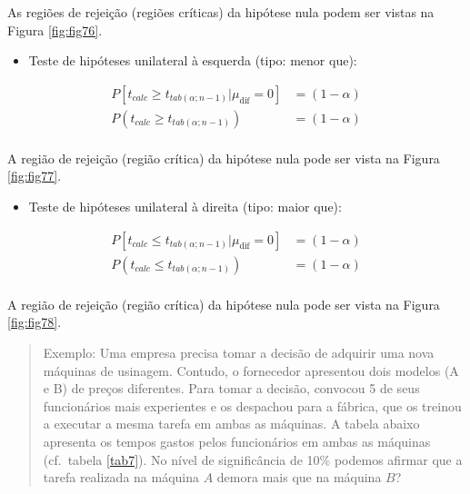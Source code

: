 \documentclass[
]{book}
\providecommand{\tightlist}{%
  \setlength{\itemsep}{0pt}\setlength{\parskip}{0pt}}
\begin{document}
\hfill\break

As regiões de rejeição (regiões críticas) da hipótese nula podem ser vistas na Figura \ref{fig:fig76}.

\hfill\break

\begin{itemize}
\tightlist
\item
  Teste de hipóteses unilateral à esquerda (tipo: menor que):
\end{itemize}

\hfill\break

\begin{align*}
P[t_{calc} \ge {t}_{tab\left(\alpha ; n-1\right)} |\mu_{\text{dif}}=0] &  =(1-\alpha)\\
P(t_{calc}  \ge {t}_{tab\left(\alpha ; n-1\right)}) & = (1-\alpha) \\ 
\end{align*}

\hfill\break

A região de rejeição (região crítica) da hipótese nula pode ser vista na Figura \ref{fig:fig77}.

\hfill\break

\begin{itemize}
\tightlist
\item
  Teste de hipóteses unilateral à direita (tipo: maior que):
\end{itemize}

\hfill\break

\begin{align*}
P[t_{calc} \le {t}_{tab\left(\alpha ; n-1\right)}|\mu_{\text{dif}}=0]  & = (1-\alpha)\\  
P( t_{calc}  \le  {t}_{tab\left(\alpha ; n-1\right)}) & = (1-\alpha)\\ 
\end{align*}

\hfill\break

A região de rejeição (região crítica) da hipótese nula pode ser vista na Figura \ref{fig:fig78}.

\hfill\break

\begin{quote}
Exemplo: Uma empresa precisa tomar a decisão de adquirir uma nova máquinas de usinagem. Contudo, o fornecedor apresentou dois modelos (A e B) de preços diferentes. Para tomar a decisão, convocou 5 de seus funcionários mais experientes e os despachou para a fábrica, que os treinou a executar a mesma tarefa em ambas as máquinas. A tabela abaixo apresenta os tempos gastos pelos funcionários em ambas as máquinas (cf.~tabela \ref{tab7}). No nível de significância de 10\% podemos afirmar que a tarefa realizada na máquina \(A\) demora mais que na máquina \(B\)?
\end{quote}
\end{document}
